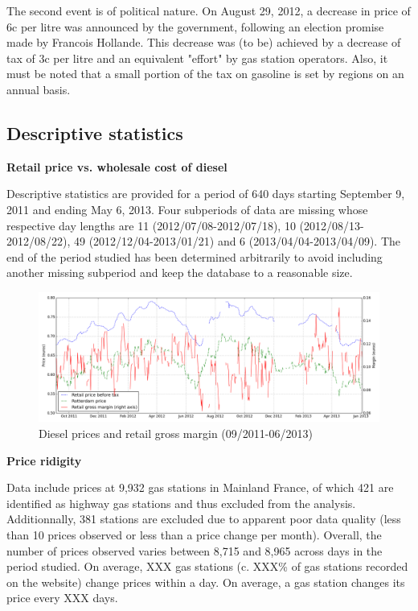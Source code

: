 \documentclass[11pt]{article}
\begin{document}
The second event is of political nature.
On August 29, 2012, a decrease in price of 6c per litre was announced by the government, following an election promise made by Francois Hollande. This decrease was (to be) achieved by a decrease of tax of 3c per litre and an equivalent "effort" by gas station operators. Also, it must be noted that a small portion of the tax on gasoline is set by regions on an annual basis.

\subsection{Descriptive statistics}

\textbf{Retail price vs. wholesale cost of diesel}

Descriptive statistics are provided for a period of 640 days starting September 9, 2011 and ending May 6, 2013. Four subperiods of data are missing whose respective day lengths are 11 (2012/07/08-2012/07/18), 10 (2012/08/13-2012/08/22), 49 (2012/12/04-2013/01/21) and 6 (2013/04/04-2013/04/09). The end of the period studied has been determined arbitrarily to avoid including another missing subperiod and keep the database to a reasonable size.

\begin{figure}[!h]
    \caption{Diesel prices and retail gross margin (09/2011-06/2013)}
	\centering
		\includegraphics[width=16cm]{graphs/diesel_price_margin.png}
\end{figure}

\textbf{Price ridigity}

Data include prices at 9,932 gas stations in Mainland France, of which 421 are identified as highway gas stations and thus excluded from the analysis. Additionnally, 381 stations are excluded due to apparent poor data quality (less than 10 prices observed or less than a price change per month). Overall, the number of prices observed varies between 8,715 and 8,965 across days in the period studied. On average, XXX gas stations (c. XXX\% of gas stations recorded on the website) change prices within a day. On average, a gas station changes its price every XXX days.
\end{document}
